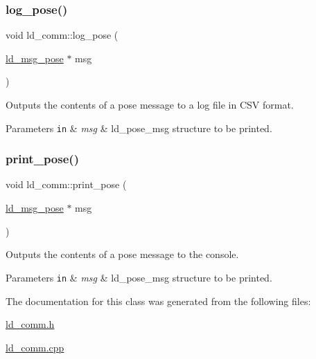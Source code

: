 \subsubsection{\texorpdfstring{log\+\_\+pose()}{log\_pose()}}
{\footnotesize\ttfamily void ld\+\_\+comm\+::log\+\_\+pose (\begin{DoxyParamCaption}\item[{\hyperlink{structld__msg__pose}{ld\+\_\+msg\+\_\+pose} $\ast$}]{msg }\end{DoxyParamCaption})}

Outputs the contents of a pose message to a log file in C\+SV format. 
\begin{DoxyParams}[1]{Parameters}
\mbox{\tt in}  & {\em msg} & ld\+\_\+pose\+\_\+msg structure to be printed. \\
\hline
\end{DoxyParams}
\mbox{\label{classld__comm_aceb15ae4635e8033ec46cb1a54a99c1f}} 
\subsubsection{\texorpdfstring{print\+\_\+pose()}{print\_pose()}}
{\footnotesize\ttfamily void ld\+\_\+comm\+::print\+\_\+pose (\begin{DoxyParamCaption}\item[{\hyperlink{structld__msg__pose}{ld\+\_\+msg\+\_\+pose} $\ast$}]{msg }\end{DoxyParamCaption})}

Outputs the contents of a pose message to the console. 
\begin{DoxyParams}[1]{Parameters}
\mbox{\tt in}  & {\em msg} & ld\+\_\+pose\+\_\+msg structure to be printed. \\
\hline
\end{DoxyParams}


The documentation for this class was generated from the following files\+:\begin{DoxyCompactItemize}
\item 
\hyperlink{ld__comm_8h}{ld\+\_\+comm.\+h}\item 
\hyperlink{ld__comm_8cpp}{ld\+\_\+comm.\+cpp}\end{DoxyCompactItemize}
